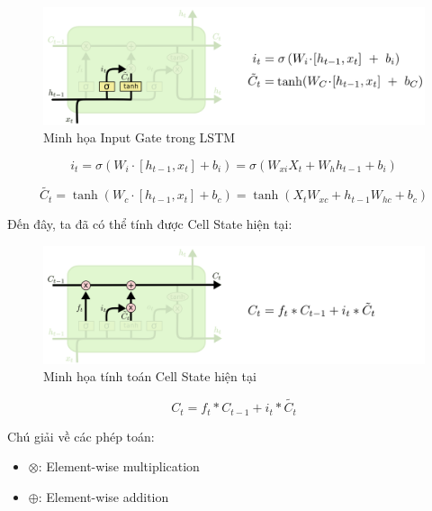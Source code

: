 \begin{figure}[h!]
    \centering
    \includegraphics[width=\textwidth]{images/LSTM/lstm-input-i.png}
    \caption{Minh họa Input Gate trong LSTM}
    \label{fig:lstm_input_gate}
\end{figure}

\begin{equation*}
    i_t = \sigma \left( W_i \cdot [h_{t-1}, x_t] + b_i \right) = \sigma (W_{xi} X_t + W_h h_{t-1} + b_i)
\end{equation*}

\begin{equation*}
    \tilde{C_t} = \tanh \left( W_c \cdot [h_{t-1}, x_t] + b_c \right) = \tanh (X_t W_{xc} + h_{t-1} W_{hc} + b_c)
\end{equation*}

Đến đây, ta đã có thể tính được Cell State hiện tại:

\begin{figure}[h!]
    \centering
    \includegraphics[width=\textwidth]{images/LSTM/lstm-cellstate-c.png}
    \caption{Minh họa tính toán Cell State hiện tại}
    \label{fig:lstm_cell_state}
\end{figure}

\begin{equation*}
    C_t = f_t * C_{t-1} + i_t * \tilde{C_t}
\end{equation*}

Chú giải về các phép toán:

\begin{itemize}
    \item \(\otimes\): Element-wise multiplication
    \item \(\oplus\): Element-wise addition
\end{itemize}

